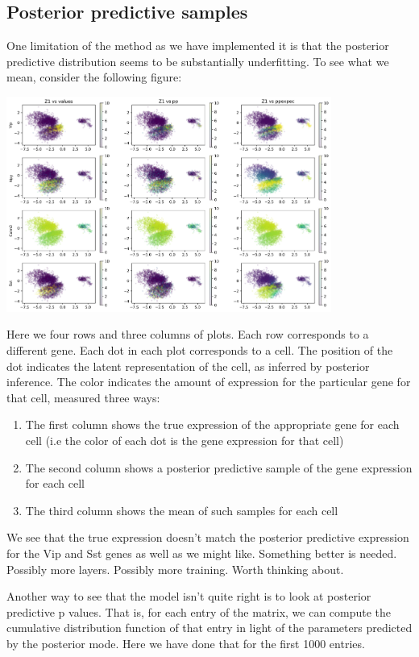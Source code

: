 \subsection{Posterior predictive samples}

One limitation of the method as we have implemented it is that the posterior predictive distribution seems to be substantially underfitting.  To see what we mean, consider the following figure:

\includegraphics[width=0.8\textwidth]{pics/Z1gn}

Here we four rows and three columns of plots.  Each row corresponds to a different gene.  Each dot in each plot corresponds to a cell.  The position of the dot indicates the latent representation of the cell, as inferred by posterior inference.  The color indicates the amount of expression for the particular gene for that cell, measured three ways:

\begin{enumerate}
\item The first column shows the true expression of the appropriate gene for each cell (i.e the color of each dot is the gene expression for that cell)
\item The second column shows a posterior predictive sample of the gene expression for each cell
\item The third column shows the mean of such samples for each cell
\end{enumerate}

We see that the true expression doesn't match the posterior predictive expression for the Vip and Sst genes as well as we might like.  Something better is needed.  Possibly more layers.  Possibly more training.  Worth thinking about.

Another way to see that the model isn't quite right is to look at posterior predictive p values.  That is, for each entry of the matrix, we can compute the cumulative distribution function of that entry in light of the parameters predicted by the posterior mode.  Here we have done that for the first 1000 entries.  

